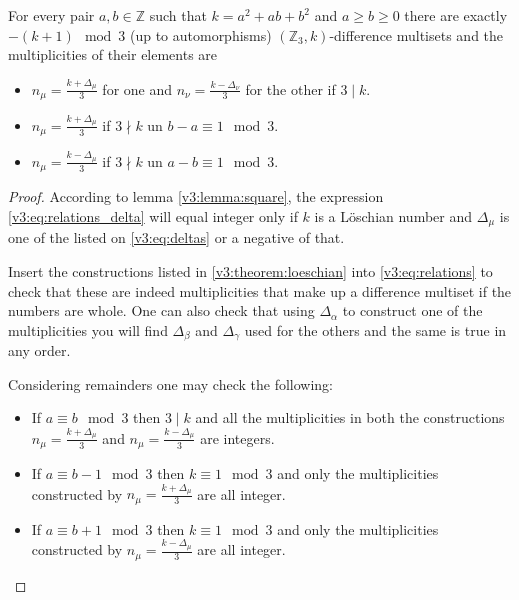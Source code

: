     \begin{theorem}
        \label{v3:theorem:loeschian}
        For every pair $a,b \in \mathbb Z$ such that $k=a^2+ab+b^2$ and $a \geq b \geq 0$ there are exactly $-(k+1) \mod 3$ (up to automorphisms) $(\mathbb Z_3,k)$-difference multisets and the multiplicities of their elements are
        
        \begin{itemize}
            \item $n_\mu=\frac{k+\Delta_\mu}{3}$ for one and $n_\nu=\frac{k-\Delta_\nu}{3}$ for the other if $3 \mid k$.
            \item $n_\mu=\frac{k+\Delta_\mu}{3}$ if $3 \nmid k$ un $b-a \equiv 1 \mod 3$.
            \item $n_\mu=\frac{k-\Delta_\mu}{3}$ if $3 \nmid k$ un $a-b \equiv 1 \mod 3$.
        \end{itemize}
    \end{theorem}

    \begin{proof}
        According to lemma \ref{v3:lemma:square}, the expression \eqref{v3:eq:relations_delta} will equal integer only if $k$ is a Löschian number and $\Delta_\mu$ is one of the listed on \eqref{v3:eq:deltas} or a negative of that.
        
        Insert the constructions listed in \eqref{v3:theorem:loeschian} into \eqref{v3:eq:relations} to check that these are indeed multiplicities that make up a difference multiset if the numbers are whole. One can also check that using $\Delta_\alpha$ to construct one of the multiplicities you will find $\Delta_\beta$ and $\Delta_\gamma$ used for the others and the same is true in any order.
        
        Considering remainders one may check the following:
        \begin{itemize}
            \item If $a \equiv b \mod 3$ then $3 \mid k$ and all the multiplicities in both the constructions $n_\mu=\frac{k+\Delta_\mu}{3}$ and $n_\mu=\frac{k-\Delta_\mu}{3}$ are integers.
            \item If $a \equiv b-1 \mod 3$ then $k \equiv 1 \mod 3$ and only the multiplicities constructed by $n_\mu=\frac{k+\Delta_\mu}{3}$ are all integer.
            \item If $a \equiv b+1 \mod 3$ then $k \equiv 1 \mod 3$ and only the multiplicities constructed by $n_\mu=\frac{k-\Delta_\mu}{3}$ are all integer.
        \end{itemize}
    \end{proof}

